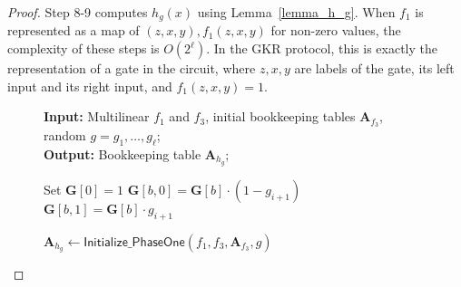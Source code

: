 {\begin{proof}
	Step 8-9 computes $h_g(x)$ using Lemma~\ref{lemma_h_g}. When $f_1$ is represented as a map of $(z,x,y), f_1(z,x,y)$ for non-zero values, the complexity of these steps is $O(2^\ell)$. In the GKR protocol, this is exactly the representation of a gate in the circuit, where $z,x,y$ are labels of the gate, its left input and its right input, and $f_1(z,x,y)=1$.
	
\begin{figure}[t!]
\begin{algorithm}[H]
	\caption{$\textbf{A}_{h_g}\leftarrow \textsf{Initialize\_PhaseOne}(f_1, f_3,\textbf{A}_{f_3}, g)$}\label{alg:init_h_g}
	\textbf{Input:} Multilinear $f_1$ and $f_3$, initial bookkeeping tables $\textbf{A}_{f_3}$, random $g = g_1,\ldots,g_\ell$;  \\
	\textbf{Output:} Bookkeeping table $\textbf{A}_{h_g}$;
	\begin{algorithmic}[1]
		    
		\State Set $\textbf{G}[0] = 1$
		\State $\textbf{G}[b,0] = \textbf{G}[b]\cdot(1-g_{i+1})$
		\State $\textbf{G}[b,1] = \textbf{G}[b]\cdot g_{i+1}$
		\EndFor
		\EndFor
		\EndProcedure
		
		\EndFor
	\end{algorithmic}
	\end{algorithm}

\end{figure}	
	
\end{proof}	
	



 

}
